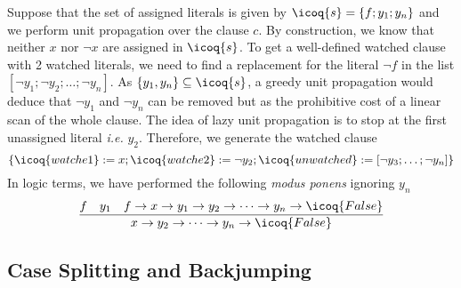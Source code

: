 \documentclass[a4paper,UKenglish,cleveref, autoref, thm-restate]{lipics-v2019}
\begin{document}
\begin{example}
  Suppose that the set of assigned literals is given by
  $\icoq{s} = \{ f; y_1; y_n \}$ and we perform unit
  propagation over the clause $c$.  By construction, we know that
  neither $x$ nor $\neg x$ are assigned in $\icoq{s}$. To get a
  well-defined watched clause with 2 watched literals, we need to find
  a replacement for the literal $\neg f$ in the list
  $[\neg y_1;\neg y_2;\ldots;\neg y_n]$.
  As $\{y_1, y_n\} \subseteq  \icoq{s}$, a greedy unit propagation would deduce that
  $\neg y_1$ and $\neg y_n$ can be removed but as the prohibitive cost of a linear scan of the whole clause.
  The idea of lazy unit propagation is to stop at the first unassigned literal \emph{i.e.} $y_2$.
  Therefore, we generate the watched clause
  \[
    \{ \icoq{watche1} := x ; \icoq{watche2} := \neg y_2 ; \icoq{unwatched} := [\neg y_3;\dots;\neg y_n] \}
    \]
    In logic terms, we have performed the following \emph{modus ponens} ignoring $y_n$
    \[
      \dfrac{
        f \quad y_1 \quad f \to x \to y_1 \to y_2 \to \dots  \to y_n \to \icoq{False}
      }
      {  x \to y_2 \to \dots \to y_n \to \icoq{False} }
    \]
\end{example}


\subsection{Case Splitting and Backjumping}
\label{sec:case-split}
\end{document}
